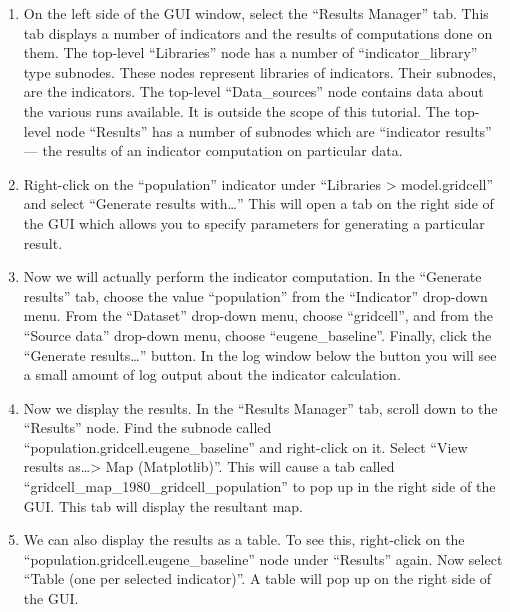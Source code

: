 \documentclass{howto}
\begin{document}
\begin{enumerate}

\item On the left side of the GUI window, select the ``Results Manager''
tab.  This tab displays a number of indicators and the results of
computations done on them.  The top-level ``Libraries'' node has a number
of \mbox{``indicator_library''} type subnodes.  These nodes represent
libraries of indicators.  Their subnodes, are the indicators.  The
top-level ``Data_sources'' node contains data about the various runs
available.  It is outside the scope of this tutorial.  The top-level node
``Results'' has a number of subnodes which are ``indicator results'' ---
the results of an indicator computation on particular data.

\item Right-click on the ``population'' indicator under ``Libraries >
model.gridcell'' and select ``Generate results with\ldots''  This will open a
tab on the right side of the GUI which allows you to specify parameters for
generating a particular result.

\item Now we will actually perform the indicator computation.  In the
``Generate results'' tab, choose the value ``population'' from the
``Indicator'' drop-down menu.  From the ``Dataset'' drop-down menu, choose
``gridcell'', and from the ``Source data'' drop-down menu, choose
``eugene_baseline''.  Finally, click the ``Generate results\ldots'' button.
In the log window below the button you will see a small amount of log
output about the indicator calculation.

\item Now we display the results.  In the ``Results Manager'' tab, scroll
down to the ``Results'' node.  Find the subnode called
``population.gridcell.eugene_baseline'' and right-click on it.  Select
``View results as\ldots > Map (Matplotlib)''.  This will cause a tab called
``gridcell_map_1980_gridcell_population'' to pop up in the right side of
the GUI.  This tab will display the resultant map.

\item We can also display the results as a table.  To see this, right-click on the 
``population.gridcell.eugene_baseline'' node under ``Results'' again.  Now select 
``Table (one per selected indicator)''.  A table will pop up on the right side of the GUI.

\end{enumerate}
\end{document}
